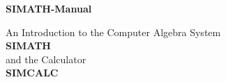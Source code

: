 \vspace*{5cm}  
\thispagestyle{empty}

\begin{center}

\begin{Huge}
\bf SIMATH-Manual\\ 
\end{Huge}

\vspace{3cm}

\begin{LARGE}
An Introduction to the Computer Algebra System\\[2ex]
{\bf SIMATH}\\[2ex]
and the Calculator\\[3ex] 
{\bf SIMCALC} 
\end{LARGE}

\vspace{6cm}

\end{center}

\newpage {\ }\thispagestyle{empty}\newpage
